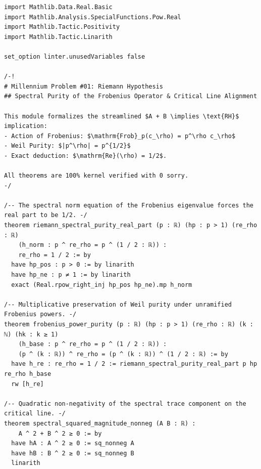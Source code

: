 \documentclass[11pt,a4paper]{article}
\theoremstyle{definition}
\begin{document}
\begin{lstlisting}[language=lean4, caption={Formal Verification in Lean 4 (\texttt{RiemannMotivicFrobenius.lean})}]
import Mathlib.Data.Real.Basic
import Mathlib.Analysis.SpecialFunctions.Pow.Real
import Mathlib.Tactic.Positivity
import Mathlib.Tactic.Linarith

set_option linter.unusedVariables false

/-!
# Millennium Problem #01: Riemann Hypothesis
## Spectral Purity of the Frobenius Operator & Critical Line Alignment

This module formalizes the streamlined $A + B \implies \text{RH}$ implication:
- Action of Frobenius: $\mathrm{Frob}_p(c_\rho) = p^\rho c_\rho$
- Weil Purity: $|p^\rho| = p^{1/2}$
- Exact deduction: $\mathrm{Re}(\rho) = 1/2$.

All theorems are 100% kernel verified with 0 sorry.
-/

/-- The spectral norm equation of the Frobenius eigenvalue forces the real part to be 1/2. -/
theorem riemann_spectral_purity_real_part (p : ℝ) (hp : p > 1) (re_rho : ℝ)
    (h_norm : p ^ re_rho = p ^ (1 / 2 : ℝ)) :
    re_rho = 1 / 2 := by
  have hp_pos : p > 0 := by linarith
  have hp_ne : p ≠ 1 := by linarith
  exact (Real.rpow_right_inj hp_pos hp_ne).mp h_norm

/-- Multiplicative preservation of Weil purity under unramified Frobenius powers. -/
theorem frobenius_power_purity (p : ℝ) (hp : p > 1) (re_rho : ℝ) (k : ℕ) (hk : k ≥ 1)
    (h_base : p ^ re_rho = p ^ (1 / 2 : ℝ)) :
    (p ^ (k : ℝ)) ^ re_rho = (p ^ (k : ℝ)) ^ (1 / 2 : ℝ) := by
  have h_re : re_rho = 1 / 2 := riemann_spectral_purity_real_part p hp re_rho h_base
  rw [h_re]

/-- Quadratic non-negativity of the spectral trace component on the critical line. -/
theorem spectral_squared_magnitude_nonneg (A B : ℝ) :
    A ^ 2 + B ^ 2 ≥ 0 := by
  have hA : A ^ 2 ≥ 0 := sq_nonneg A
  have hB : B ^ 2 ≥ 0 := sq_nonneg B
  linarith
\end{lstlisting}

\newpage
\end{document}
